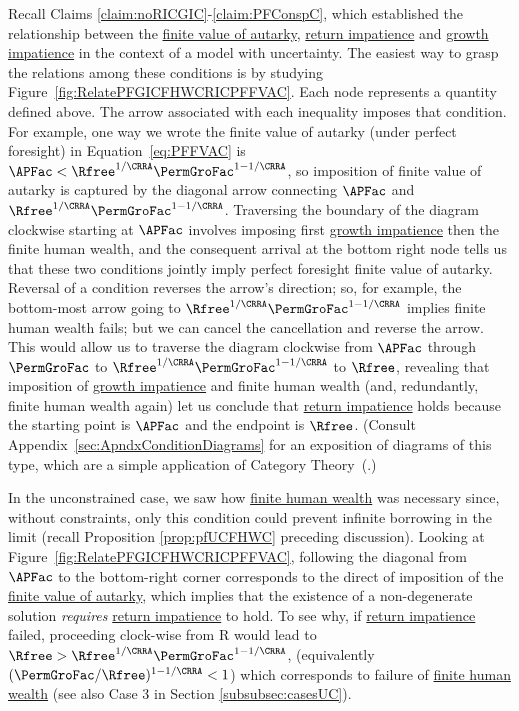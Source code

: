 \documentclass[BufferStockTheory]{subfiles}
\begin{document}
Recall Claims \ref{claim:noRICGIC}-\ref{claim:PFConspC}, which established the relationship between the \hyperlink{PF-FVAC}{finite value of autarky}, \hyperlink{RIC}{return impatience} and \hyperlink{GIC}{growth impatience} in the context of a model with uncertainty. The easiest way to grasp the relations among these conditions is by studying Figure~\ref{fig:RelatePFGICFHWCRICPFFVAC}.  Each node represents a quantity defined above.  The arrow associated with each inequality imposes that condition.  For example, one way we wrote the \hypertarget{PFFVAC}{finite value of autarky} (under perfect foresight) in Equation~\eqref{eq:PFFVAC} is $\APFac < \Rfree^{1/\CRRA} \PermGroFac^{1-1/\CRRA}$, so imposition of \hypertarget{PFFVAC}{finite value of autarky} is captured by the diagonal arrow connecting $\APFac$ and $\Rfree^{1/\CRRA}\PermGroFac^{1-1/\CRRA}$.  Traversing the boundary of the diagram clockwise starting at $\APFac$ involves imposing first \hyperlink{GICRaw}{growth impatience} then the \hypertarget{FHWC}{finite human wealth}, and the consequent arrival at the bottom right node tells us that these two conditions jointly imply \hypertarget{PFFVAC}{perfect foresight finite value of autarky}.  Reversal of a condition reverses the arrow's direction; so, for example, the bottom-most arrow going to $\Rfree^{1/\CRRA}\PermGroFac^{1-1/\CRRA}$ implies  \hypertarget{FHWC}{finite human wealth} fails; but we can cancel the cancellation and reverse the arrow.  This would allow us to traverse the diagram clockwise from $\APFac$  through $\PermGroFac$ to $\Rfree^{1/\CRRA}\PermGroFac^{1-1/\CRRA}$ to $\Rfree$, revealing that imposition of \hyperlink{GICRaw}{growth impatience} and \hypertarget{FHWC}{finite human wealth} (and, redundantly, \hypertarget{FHWC}{finite human wealth} again) let us conclude that \hyperlink{RIC}{return impatience} holds because the starting point is $\APFac$ and the endpoint is $\Rfree$.  (Consult Appendix~\ref{sec:ApndxConditionDiagrams} for an exposition of diagrams of this type, which are a simple application of Category Theory~(\cite{riehl2017category}.)

\renewcommand{\figName}{RelatePFGICFHWCRICPFFVAC} 
\hypertarget{\figName}{}

In the unconstrained case, we saw how \hyperlink{FHWC}{finite human wealth} was necessary since, without constraints, only  this condition could prevent infinite borrowing in the limit (recall Proposition \ref{prop:pfUCFHWC} preceding discussion). Looking at Figure~\ref{fig:RelatePFGICFHWCRICPFFVAC}, following the diagonal from $\APFac$ to the bottom-right corner corresponds to the direct of imposition of the \hyperlink{PFFVAC}{finite value of autarky}, which implies that the existence of a non-degenerate solution \textit{requires} \hyperlink{RIC}{return impatience} to hold. To see why, if \hyperlink{RIC}{return impatience} failed, proceeding clock-wise from R would lead to $\Rfree> \Rfree^{1/\CRRA}\PermGroFac^{1-1/\CRRA}$, (equivalently $(\PermGroFac/\Rfree)^{1-{1/\CRRA}}<1$) which corresponds to failure of \hyperlink{FHWC}{finite human wealth} (see also Case 3 in Section \ref{subsubsec:casesUC}). 
\end{document}
